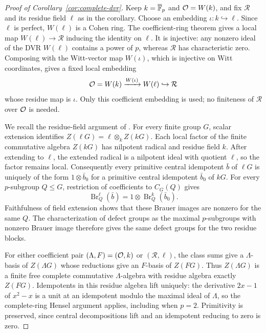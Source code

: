 \begin{proof}[Proof of Corollary~\ref{cor:complete-dvr}]
Keep $k=\overline{\mathbb F}_p$ and $\mathcal O=W(k)$, and fix $\mathcal R$ and
its residue field $\ell$ as in the corollary.  Choose an embedding
$\iota:k\hookrightarrow\ell$.  Since $\ell$ is perfect, $W(\ell)$ is
a Cohen ring.  The coefficient-ring theorem
\cite[Theorem~10.160.8, Tag~032A]{StacksCohen} gives a local map
$W(\ell)\to\mathcal R$ inducing the identity on $\ell$.  It is
injective: any nonzero ideal of the DVR $W(\ell)$ contains a power of
$p$, whereas $\mathcal R$ has characteristic zero.  Composing with the
Witt-vector map $W(\iota)$, which is injective on Witt coordinates,
gives a fixed local embedding
\[
 \mathcal O=W(k)\xrightarrow{W(\iota)}W(\ell)\hookrightarrow\mathcal R
\]
whose residue map is $\iota$.  Only this coefficient embedding is
used; no finiteness of $\mathcal R$ over $\mathcal O$ is needed.

We recall the residue-field argument of
\cite[Section~2.1]{OpenAIAlperinWeight2026}.  For every finite group
$G$, scalar extension identifies
$Z(\ell G)=\ell\otimes_k Z(kG)$.  Each local factor of the finite
commutative algebra $Z(kG)$ has nilpotent radical and residue field
$k$.  After extending to $\ell$, the extended radical is a nilpotent
ideal with quotient $\ell$, so the factor remains local.
Consequently every primitive central idempotent $\bar b$ of $\ell G$
is uniquely of the form $1\otimes\bar b_0$ for a primitive central
idempotent $\bar b_0$ of $kG$.  For every $p$-subgroup $Q\leq G$,
restriction of coefficients to $C_G(Q)$ gives
\[
 \operatorname{Br}^{\ell}_Q(\bar b)
   =1\otimes\operatorname{Br}^{k}_Q(\bar b_0).
\]
Faithfulness of field extension shows that these Brauer images are
nonzero for the same $Q$.  The characterization of defect groups as
the maximal $p$-subgroups with nonzero Brauer image therefore gives the
same defect groups for the two residue blocks.

For either coefficient pair $(\Lambda,F)=(\mathcal O,k)$ or
$(\mathcal R,\ell)$, the class sums give a $\Lambda$-basis of
$Z(\Lambda G)$ whose reductions give an $F$-basis of $Z(FG)$.
Thus $Z(\Lambda G)$ is a finite free complete commutative
$\Lambda$-algebra with residue algebra exactly $Z(FG)$.  Idempotents
in this residue algebra lift uniquely: the derivative $2x-1$ of
$x^2-x$ is a unit at an idempotent modulo the maximal ideal of
$\Lambda$, so the complete-ring Hensel argument applies, including
when $p=2$.  Primitivity is preserved, since central decompositions lift and
an idempotent reducing to zero is zero.


\end{proof}
